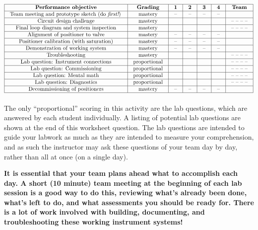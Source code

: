 \documentclass[12pt,a4paper]{article}
\begin{document}
\begin{itemize}


$$\vbox{\offinterlineskip
\halign{\strut
\vrule \quad\hfil # \ \hfil & 
\vrule \quad\hfil # \ \hfil & 
\vrule \quad\hfil # \ \hfil & 
\vrule \quad\hfil # \ \hfil & 
\vrule \quad\hfil # \ \hfil & 
\vrule \quad\hfil # \ \hfil & 
\vrule \quad\hfil # \ \hfil \vrule \cr
\noalign{\hrule}
%
{\bf Performance objective} & {\bf Grading} & {\bf 1} & {\bf 2} & {\bf 3} & {\bf 4} & {\bf Team} \cr
%
\noalign{\hrule}
%
Team meeting and prototype sketch (do {\it first!}) & mastery & -- & -- & -- & -- & \cr
%
\noalign{\hrule}
%
Circuit design challenge & mastery & & & & & -- -- -- -- \cr
%
\noalign{\hrule}
%
Final loop diagram and system inspection & mastery & & & & & -- -- -- -- \cr
%
\noalign{\hrule}
%
Alignment of positioner to valve & mastery & -- & -- & -- & -- & \cr
%
\noalign{\hrule}
%
Positioner calibration (with saturation) & mastery & -- & -- & -- & -- &  \cr
%
\noalign{\hrule}
%
Demonstration of working system & mastery & -- & -- & -- & -- & \cr
%
\noalign{\hrule}
%
Troubleshooting & mastery & & & & & -- -- -- -- \cr
%
\noalign{\hrule}
%
Lab question: Instrument connections & proportional &  &  &  &  & -- -- -- -- \cr
%
\noalign{\hrule}
%
Lab question: Commissioning & proportional &  &  &  &  & -- -- -- -- \cr
%
\noalign{\hrule}
%
Lab question: Mental math & proportional &  &  &  &  & -- -- -- -- \cr
%
\noalign{\hrule}
%
Lab question: Diagnostics & proportional &  &  &  &  & -- -- -- -- \cr
%
\noalign{\hrule}
%
Decommissioning of positioners & mastery & -- & -- & -- & -- &  \cr
%
\noalign{\hrule}
} %
}$$ %

The only ``proportional'' scoring in this activity are the lab questions, which are answered by each student individually.  A listing of potential lab questions are shown at the end of this worksheet question.  The lab questions are intended to guide your labwork as much as they are intended to measure your comprehension, and as such the instructor may ask these questions of your team day by day, rather than all at once (on a single day).


{\bf It is essential that your team plans ahead what to accomplish each day.  A short (10 minute) team meeting at the beginning of each lab session is a good way to do this, reviewing what's already been done, what's left to do, and what assessments you should be ready for.  There is a lot of work involved with building, documenting, and troubleshooting these working instrument systems!}


\end{itemize}
\end{document}
